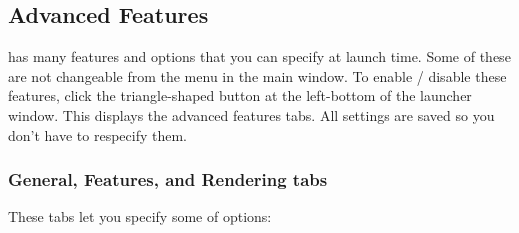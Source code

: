 \subsection{Advanced Features}
\FlightGear{} has many features and options that you can specify at launch time. Some of these are not changeable from the menu in the \FlightGear{} main window. To enable / disable these features, click the triangle-shaped button at the left-bottom of the launcher window. This displays the advanced features tabs. All settings are saved so you don't have to respecify them.

\subsubsection{General, Features, and Rendering tabs}
These tabs let you specify some of \FlightGear{} options:
